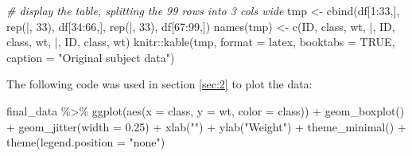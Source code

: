 \documentclass[smallextended]{svjour3}       %
\newenvironment{Shaded}{\begin{snugshade}}{\end{snugshade}}
\newcommand{\AttributeTok}[1]{\textcolor[rgb]{0.77,0.63,0.00}{#1}}
\newcommand{\CommentTok}[1]{\textcolor[rgb]{0.56,0.35,0.01}{\textit{#1}}}
\newcommand{\ConstantTok}[1]{\textcolor[rgb]{0.00,0.00,0.00}{#1}}
\newcommand{\DecValTok}[1]{\textcolor[rgb]{0.00,0.00,0.81}{#1}}
\newcommand{\FloatTok}[1]{\textcolor[rgb]{0.00,0.00,0.81}{#1}}
\newcommand{\FunctionTok}[1]{\textcolor[rgb]{0.00,0.00,0.00}{#1}}
\newcommand{\NormalTok}[1]{#1}
\newcommand{\OtherTok}[1]{\textcolor[rgb]{0.56,0.35,0.01}{#1}}
\newcommand{\SpecialCharTok}[1]{\textcolor[rgb]{0.00,0.00,0.00}{#1}}
\newcommand{\StringTok}[1]{\textcolor[rgb]{0.31,0.60,0.02}{#1}}
\begin{document}
\begin{Shaded}
\begin{Highlighting}[]
\CommentTok{\# display the table, splitting the 99 rows into 3 cols wide}
\NormalTok{tmp }\OtherTok{\textless{}{-}} \FunctionTok{cbind}\NormalTok{(df[}\DecValTok{1}\SpecialCharTok{:}\DecValTok{33}\NormalTok{,], }\FunctionTok{rep}\NormalTok{(}\StringTok{\textquotesingle{}|\textquotesingle{}}\NormalTok{, }\DecValTok{33}\NormalTok{), }
\NormalTok{             df[}\DecValTok{34}\SpecialCharTok{:}\DecValTok{66}\NormalTok{,], }\FunctionTok{rep}\NormalTok{(}\StringTok{\textquotesingle{}|\textquotesingle{}}\NormalTok{, }\DecValTok{33}\NormalTok{), }
\NormalTok{             df[}\DecValTok{67}\SpecialCharTok{:}\DecValTok{99}\NormalTok{,])}
\FunctionTok{names}\NormalTok{(tmp) }\OtherTok{\textless{}{-}} \FunctionTok{c}\NormalTok{(}\StringTok{\textquotesingle{}ID\textquotesingle{}}\NormalTok{, }\StringTok{\textquotesingle{}class\textquotesingle{}}\NormalTok{, }\StringTok{\textquotesingle{}wt\textquotesingle{}}\NormalTok{, }\StringTok{\textquotesingle{}|\textquotesingle{}}\NormalTok{, }\StringTok{\textquotesingle{}ID\textquotesingle{}}\NormalTok{, }\StringTok{\textquotesingle{}class\textquotesingle{}}\NormalTok{, }\StringTok{\textquotesingle{}wt\textquotesingle{}}\NormalTok{, }
                \StringTok{\textquotesingle{}|\textquotesingle{}}\NormalTok{, }\StringTok{\textquotesingle{}ID\textquotesingle{}}\NormalTok{, }\StringTok{\textquotesingle{}class\textquotesingle{}}\NormalTok{, }\StringTok{\textquotesingle{}wt\textquotesingle{}}\NormalTok{)}
\NormalTok{knitr}\SpecialCharTok{::}\FunctionTok{kable}\NormalTok{(tmp, }\AttributeTok{format =} \StringTok{\textquotesingle{}latex\textquotesingle{}}\NormalTok{, }\AttributeTok{booktabs =} \ConstantTok{TRUE}\NormalTok{, }
             \AttributeTok{caption =} \StringTok{"Original subject data"}\NormalTok{)}
\end{Highlighting}
\end{Shaded}

The following code was used in section \ref{sec:2} to plot the data:

\begin{Shaded}
\begin{Highlighting}[]
\NormalTok{final\_data }\SpecialCharTok{\%\textgreater{}\%} 
  \FunctionTok{ggplot}\NormalTok{(}\FunctionTok{aes}\NormalTok{(}\AttributeTok{x =}\NormalTok{ class, }\AttributeTok{y =}\NormalTok{ wt, }\AttributeTok{color =}\NormalTok{ class)) }\SpecialCharTok{+}
  \FunctionTok{geom\_boxplot}\NormalTok{() }\SpecialCharTok{+}
  \FunctionTok{geom\_jitter}\NormalTok{(}\AttributeTok{width =} \FloatTok{0.25}\NormalTok{) }\SpecialCharTok{+} 
  \FunctionTok{xlab}\NormalTok{(}\StringTok{""}\NormalTok{) }\SpecialCharTok{+}
  \FunctionTok{ylab}\NormalTok{(}\StringTok{"Weight"}\NormalTok{) }\SpecialCharTok{+} 
  \FunctionTok{theme\_minimal}\NormalTok{() }\SpecialCharTok{+}
  \FunctionTok{theme}\NormalTok{(}\AttributeTok{legend.position =} \StringTok{"none"}\NormalTok{)}
\end{Highlighting}
\end{Shaded}
\end{document}
